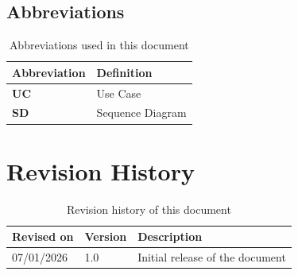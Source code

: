 \subsection{Abbreviations}
\begin{table}[H]
    \sf
    \small
    \centering
    \renewcommand{\arraystretch}{1.5}
    \begin{tabularx}{\textwidth}{|l|X|}
        \hline
        \rowcolor{lightgray} \textbf{Abbreviation} & \textbf{Definition}\\
        \hline
        \textbf{UC} & Use Case \\
        \textbf{SD} & Sequence Diagram \\
        \hline
    \end{tabularx}
    \caption{Abbreviations used in this document}
\end{table}

\section{Revision History}
\begin{table}[H]
    \sf
    \small
    \centering
    \renewcommand{\arraystretch}{1.5}
    \begin{tabularx}{\textwidth}{|l|l|X|}
        \hline
        \rowcolor{lightgray} \textbf{Revised on} & \textbf{Version} & \textbf{Description}\\
        \hline
        07/01/2026 & 1.0 & Initial release of the document \\
        \hline
    \end{tabularx}
    \caption{Revision history of this document}
\end{table}

